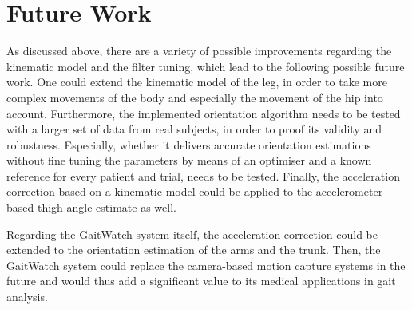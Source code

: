 \section{Future Work}

As discussed above, there are a variety of possible improvements regarding the kinematic model and the filter tuning, which lead to the following possible future work. One could extend the kinematic model of the leg, in order to take more complex movements of the body and especially the movement of the hip into account. Furthermore, the implemented orientation algorithm needs to be tested with a larger set of data from real subjects, in order to proof its validity and robustness. Especially, whether it delivers accurate orientation estimations without fine tuning the parameters by means of an optimiser and a known reference for every patient and trial, needs to be tested. Finally, the acceleration correction based on a kinematic model could be applied to the accelerometer-based thigh angle estimate as well.

Regarding the GaitWatch system itself, the acceleration correction could be extended to the orientation estimation of the arms and the trunk. Then, the GaitWatch system could replace the camera-based motion capture systems in the future and would thus add a significant value to its medical applications in gait analysis.


